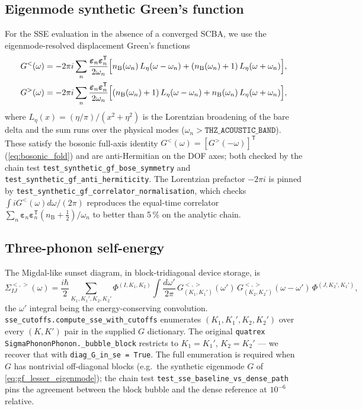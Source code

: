 \subsection{Eigenmode synthetic Green's function}
\label{ap:fa_obs_synthetic}

For the SSE evaluation in the absence of a converged SCBA, we use
the eigenmode-resolved displacement Green's functions
\begin{align}
  \label{eq:gf_lesser_eigenmode}
  G^<(\omega) &= -2\pi i\sum_{n}\frac{\boldsymbol{\varepsilon}_n
    \boldsymbol{\varepsilon}_n^{\mathsf{T}}}{2\omega_n}
    \Bigl[n_{\mathrm{B}}(\omega_n)\,L_\eta(\omega - \omega_n)
        + (n_{\mathrm{B}}(\omega_n) + 1)\,L_\eta(\omega + \omega_n)\Bigr],
\\
  G^>(\omega) &= -2\pi i\sum_{n}\frac{\boldsymbol{\varepsilon}_n
    \boldsymbol{\varepsilon}_n^{\mathsf{T}}}{2\omega_n}
    \Bigl[(n_{\mathrm{B}}(\omega_n) + 1)\,L_\eta(\omega - \omega_n)
        + n_{\mathrm{B}}(\omega_n)\,L_\eta(\omega + \omega_n)\Bigr],
\end{align}
where $L_\eta(x) = (\eta/\pi)/(x^2 + \eta^2)$ is the Lorentzian
broadening of the bare delta and the sum runs over the physical
modes ($\omega_n > \texttt{THZ\_ACOUSTIC\_BAND}$).  These satisfy the
bosonic full-axis identity $G^<(\omega) = [G^>(-\omega)]^{\mathsf{T}}$
(\cref{eq:bosonic_fold}) and are anti-Hermitian on the DOF axes;
both checked by the chain test \texttt{test\_synthetic\_gf\_bose\_symmetry}
and \texttt{test\_synthetic\_gf\_anti\_hermiticity}.  The Lorentzian
prefactor $-2\pi i$ is pinned by
\texttt{test\_synthetic\_gf\_correlator\_normalisation}, which checks
$\int i G^<(\omega) d\omega/(2\pi)$ reproduces the equal-time
correlator
$\sum_n \boldsymbol{\varepsilon}_n
       \boldsymbol{\varepsilon}_n^{\mathsf{T}}(n_{\mathrm{B}} + \tfrac12)/\omega_n$
to better than 5\,\% on the analytic chain.

\subsection{Three-phonon self-energy}
\label{ap:fa_obs_phph}

The Migdal-like sunset diagram, in block-tridiagonal device storage,
is
\begin{equation}
  \label{eq:sunset_lesser}
  \Sigma^{<,>}_{IJ}(\omega) = \frac{i\hbar}{2}
    \sum_{K_1, K_1', K_2, K_2'}
    \Phi^{(I, K_1, K_2)}
    \int\frac{d\omega'}{2\pi}\,
    G^{<,>}_{(K_1, K_1')}(\omega')\,
    G^{<,>}_{(K_2, K_2')}(\omega - \omega')\,
    \Phi^{(J, K_2', K_1')},
\end{equation}
the $\omega'$ integral being the energy-conserving convolution.
\texttt{sse\_cutoffs.compute\_sse\_with\_cutoffs} enumerates
$(K_1, K_1', K_2, K_2')$ over every $(K, K')$ pair in the supplied $G$
dictionary.  The original \texttt{quatrex} \texttt{SigmaPhononPhonon.\_bubble\_block}
restricts to $K_1 = K_1'$, $K_2 = K_2'$ — we recover that with
\texttt{diag\_G\_in\_se = True}.  The full enumeration is required
when $G$ has nontrivial off-diagonal blocks (e.g.\ the synthetic
eigenmode $G$ of \cref{eq:gf_lesser_eigenmode}); the chain test
\texttt{test\_sse\_baseline\_vs\_dense\_path} pins the agreement
between the block bubble and the dense reference at $10^{-6}$
relative.

